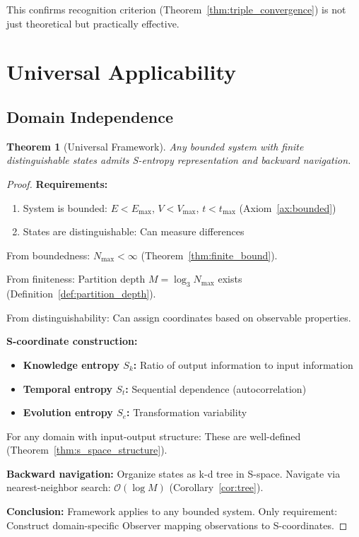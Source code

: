 \documentclass[twocolumn,10pt]{article}
\newtheorem{theorem}{Theorem}[section]
\theoremstyle{definition}
\theoremstyle{remark}
\newcommand{\Sk}{S_k}
\newcommand{\St}{S_t}
\newcommand{\Se}{S_e}
\newcommand{\Nmax}{N_{\max}}
\newcommand{\bigO}{\mathcal{O}}
\begin{document}
This confirms recognition criterion (Theorem~\ref{thm:triple_convergence}) is not just theoretical but practically effective.

\section{Universal Applicability}
\label{sec:universality}

\subsection{Domain Independence}

\begin{theorem}[Universal Framework]
\label{thm:universality}
Any bounded system with finite distinguishable states admits S-entropy representation and backward navigation.
\end{theorem}

\begin{proof}
\textbf{Requirements:}
\begin{enumerate}
\item System is bounded: $E < E_{\max}$, $V < V_{\max}$, $t < t_{\max}$ (Axiom~\ref{ax:bounded})
\item States are distinguishable: Can measure differences
\end{enumerate}

From boundedness: $\Nmax < \infty$ (Theorem~\ref{thm:finite_bound}).

From finiteness: Partition depth $M = \log_3 \Nmax$ exists (Definition~\ref{def:partition_depth}).

From distinguishability: Can assign coordinates based on observable properties.

\vspace{0.2cm}
\noindent\textbf{S-coordinate construction:}
\begin{itemize}
\item \textbf{Knowledge entropy $\Sk$:} Ratio of output information to input information
\item \textbf{Temporal entropy $\St$:} Sequential dependence (autocorrelation)
\item \textbf{Evolution entropy $\Se$:} Transformation variability
\end{itemize}

For any domain with input-output structure: These are well-defined (Theorem~\ref{thm:s_space_structure}).

\vspace{0.2cm}
\noindent\textbf{Backward navigation:} Organize states as k-d tree in S-space. Navigate via nearest-neighbor search: $\bigO(\log M)$ (Corollary~\ref{cor:tree}).

\vspace{0.2cm}
\noindent\textbf{Conclusion:} Framework applies to any bounded system. Only requirement: Construct domain-specific Observer mapping observations to S-coordinates.
\end{proof}
\end{document}
